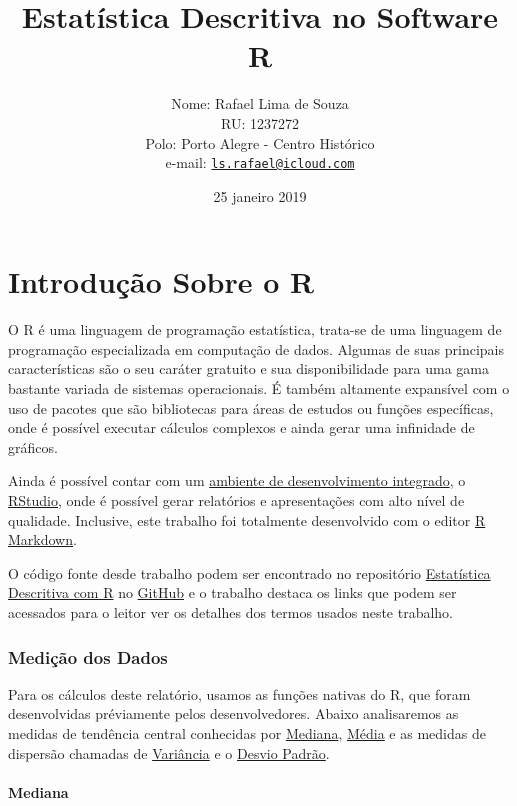 \documentclass[portuguese,]{article}
\title{Estatística Descritiva no Software R}
\author{Nome: Rafael Lima de Souza \\ RU: 1237272 \\ Polo: Porto Alegre - Centro Histórico \\ e-mail:
\href{mailto:ls.rafael@icloud.com}{\nolinkurl{ls.rafael@icloud.com}}}
\date{25 janeiro 2019}
\let\oldparagraph\paragraph
\renewcommand{\paragraph}[1]{\oldparagraph{#1}\mbox{}}
\begin{document}
\maketitle

\section{Introdução Sobre o R}\label{introducao-sobre-o-r}

O R é uma linguagem de programação estatística, trata-se de uma
linguagem de programação especializada em computação de dados. Algumas
de suas principais características são o seu caráter gratuito e sua
disponibilidade para uma gama bastante variada de sistemas operacionais.
É também altamente expansível com o uso de pacotes que são bibliotecas
para áreas de estudos ou funções específicas, onde é possível executar
cálculos complexos e ainda gerar uma infinidade de gráficos.

Ainda é possível contar com um
\href{https://pt.wikipedia.org/wiki/Ambiente_de_desenvolvimento_integrado}{ambiente
de desenvolvimento integrado}, o
\href{https://www.rstudio.com}{RStudio}, onde é possível gerar
relatórios e apresentações com alto nível de qualidade. Inclusive, este
trabalho foi totalmente desenvolvido com o editor
\href{https://rmarkdown.rstudio.com}{R Markdown}.

O código fonte desde trabalho podem ser encontrado no repositório
\href{https://github.com/ralsouza/Estatistica_Descritiva_R}{Estatística
Descritiva com R} no \href{https://github.com}{GitHub} e o trabalho
destaca os links que podem ser acessados para o leitor ver os detalhes
dos termos usados neste trabalho.

\subsubsection{Medição dos Dados}\label{medicao-dos-dados}

Para os cálculos deste relatório, usamos as funções nativas do R, que
foram desenvolvidas préviamente pelos desenvolvedores. Abaixo
analisaremos as medidas de tendência central conhecidas por
\href{https://pt.wikipedia.org/wiki/Mediana_(estat\%C3\%ADstica)}{Mediana},
\href{https://pt.wikipedia.org/wiki/M\%C3\%A9dia}{Média} e as medidas de
dispersão chamadas de
\href{https://pt.wikipedia.org/wiki/Vari\%C3\%A2ncia}{Variância} e o
\href{https://pt.wikipedia.org/wiki/Desvio_padr\%C3\%A3o}{Desvio
Padrão}.

\paragraph{Mediana}\label{mediana}
\end{document}
